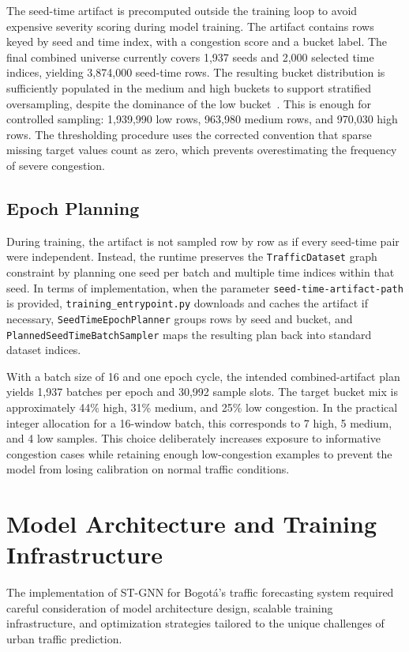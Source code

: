 \documentclass[11pt, a4paper]{article}
\begin{document}
The seed-time artifact is precomputed outside the training loop to avoid expensive severity scoring during model training. The artifact contains rows keyed by seed and time index, with a congestion score and a bucket label. The final combined universe currently covers 1,937 seeds and 2,000 selected time indices, yielding 3,874,000 seed-time rows. The resulting bucket distribution is sufficiently populated in the medium and high buckets to support stratified oversampling, despite the dominance of the low bucket~\cite{chawla2002smote}. This is enough for controlled sampling: 1,939,990 low rows, 963,980 medium rows, and 970,030 high rows. The thresholding procedure uses the corrected convention that sparse missing target values count as zero, which prevents overestimating the frequency of severe congestion.

\subsection{Epoch Planning}

During training, the artifact is not sampled row by row as if every seed-time pair were independent. Instead, the runtime preserves the \texttt{TrafficDataset} graph constraint by planning one seed per batch and multiple time indices within that seed. In terms of implementation, when the parameter \texttt{seed-time-artifact-path} is provided, \texttt{training\_entrypoint.py} downloads and caches the artifact if necessary, \texttt{SeedTimeEpochPlanner} groups rows by seed and bucket, and \texttt{PlannedSeedTimeBatchSampler} maps the resulting plan back into standard dataset indices.

With a batch size of 16 and one epoch cycle, the intended combined-artifact plan yields 1,937 batches per epoch and 30,992 sample slots. The target bucket mix is approximately 44\% high, 31\% medium, and 25\% low congestion. In the practical integer allocation for a 16-window batch, this corresponds to 7 high, 5 medium, and 4 low samples. This choice deliberately increases exposure to informative congestion cases while retaining enough low-congestion examples to prevent the model from losing calibration on normal traffic conditions.

\section{Model Architecture and Training Infrastructure}

The implementation of ST-GNN for Bogotá's traffic forecasting system required careful consideration of model architecture design, scalable training infrastructure, and optimization strategies tailored to the unique challenges of urban traffic prediction.
\end{document}
